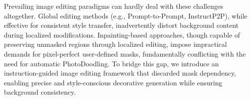 Prevailing image editing paradigms can hardly deal with these challenges altogether. Global editing methods (e.g., Prompt-to-Prompt\cite{p2p}, InstructP2P\cite{brooks2023instructpix2pix}), while effective for consistent style transfer, inadvertently distort background content during localized modifications. Inpainting-based approaches\cite{zhang2024magicbrush,stylizedneuralpainting}, though capable of preserving unmasked regions through localized editing, impose impractical demands for pixel-perfect user-defined masks, fundamentally conflicting with the need for automatic PhotoDoodling. To bridge this gap, we introduce an instruction-guided image editing framework that discarded mask dependency, enabling precise and style-conscious decorative generation while ensuring background consistency.


